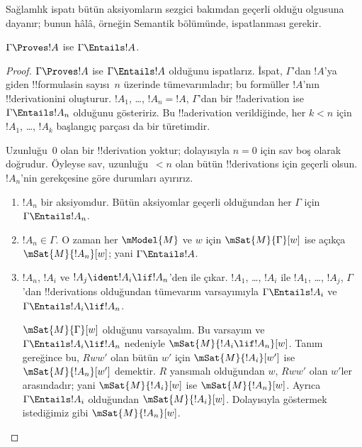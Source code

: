 



\begin{editorial}
  Sağlamlık ispatı bütün aksiyomların sezgici bakımdan geçerli olduğu
  olgusuna dayanır; bunun hâlâ, örneğin Semantik bölümünde, ispatlanması
  gerekir.
\end{editorial}

\begin{thm}[Sağlamlık]
  $\Gamma \Proves !A$ ise $\Gamma \Entails !A$.
\end{thm}

\begin{proof}
  $\Gamma \Proves !A$ ise $\Gamma \Entails !A$ olduğunu ispatlarız.
  İspat, $\Gamma$'dan $!A$'ya giden !!{formula}s{}in sayısı~$n$ üzerinde
  tümevarımladır; bu formüller $!A$'nın !!{derivation}{}ini oluşturur.
  $!A_1$, \dots, $!A_n=!A$, $\Gamma$'dan bir !!a{derivation} ise
  $\Gamma\Entails !A_n$ olduğunu gösteririz. Bu !!a{derivation} verildiğinde,
  her $k<n$ için $!A_1$, \dots, $!A_k$ başlangıç parçası da bir türetimdir.

  Uzunluğu~$0$ olan bir !!{derivation} yoktur; dolayısıyla $n=0$ için sav
  boş olarak doğrudur. Öyleyse sav, uzunluğu~$<n$ olan bütün !!{derivation}s
  için geçerli olsun. $!A_n$'nin gerekçesine göre durumları ayırırız.

  \begin{enumerate}
  \item $!A_n$ bir aksiyomdur. Bütün aksiyomlar geçerli olduğundan her
    $\Gamma$ için $\Gamma\Entails !A_n$.
  \item $!A_n\in\Gamma$. O zaman her $\mModel{M}$ ve $w$ için
    $\mSat{M}{\Gamma}[w]$ ise açıkça $\mSat{M}{!A_n}[w]$; yani
    $\Gamma\Entails !A$.
  \item $!A_n$, $!A_i$ ve $!A_j\ident !A_i\lif !A_n$'den \MP{} ile
    çıkar. $!A_1$, \dots, $!A_i$ ile $!A_1$, \dots, $!A_j$,
    $\Gamma$'dan !!{derivation}s olduğundan tümevarım varsayımıyla
    $\Gamma\Entails !A_i$ ve $\Gamma\Entails !A_i\lif !A_n$.

    $\mSat{M}{\Gamma}[w]$ olduğunu varsayalım. Bu varsayım ve
    $\Gamma\Entails !A_i\lif !A_n$ nedeniyle
    $\mSat{M}{!A_i\lif !A_n}[w]$. Tanım gereğince bu, $Rww'$ olan bütün
    $w'$ için $\mSat{M}{!A_i}[w']$ ise $\mSat{M}{!A_n}[w']$ demektir.
    $R$ yansımalı olduğundan $w$, $Rww'$ olan $w'$ler arasındadır; yani
    $\mSat{M}{!A_i}[w]$ ise $\mSat{M}{!A_n}[w]$. Ayrıca
    $\Gamma\Entails !A_i$ olduğundan $\mSat{M}{!A_i}[w]$. Dolayısıyla
    göstermek istediğimiz gibi $\mSat{M}{!A_n}[w]$.
  \end{enumerate}
\end{proof}

